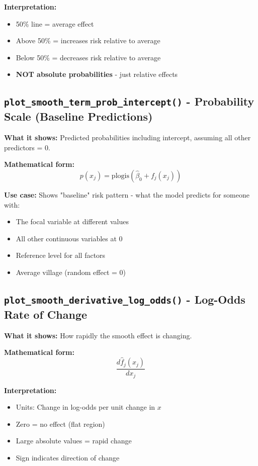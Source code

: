 \documentclass[12pt]{article}
\begin{document}
\textbf{Interpretation:}
\begin{itemize}
   \item 50\% line = average effect
   \item Above 50\% = increases risk relative to average
   \item Below 50\% = decreases risk relative to average
   \item \textbf{NOT absolute probabilities} - just relative effects
\end{itemize}

\subsection*{\texttt{plot\_smooth\_term\_prob\_intercept()} - Probability Scale (Baseline Predictions)}

\textbf{What it shows:} Predicted probabilities including intercept, assuming all other predictors = 0.

\textbf{Mathematical form:}
$$p(x_j) = \text{plogis}(\hat{\beta}_0 + f_j(x_j))$$

\textbf{Use case:} Shows "baseline" risk pattern - what the model predicts for someone with:
\begin{itemize}
   \item The focal variable at different values
   \item All other continuous variables at 0
   \item Reference level for all factors
   \item Average village (random effect = 0)
\end{itemize}

\subsection*{\texttt{plot\_smooth\_derivative\_log\_odds()} - Log-Odds Rate of Change}

\textbf{What it shows:} How rapidly the smooth effect is changing.

\textbf{Mathematical form:}
$$\frac{d\hat{f}_j(x_j)}{dx_j}$$

\textbf{Interpretation:}
\begin{itemize}
   \item Units: Change in log-odds per unit change in $x$
   \item Zero = no effect (flat region)
   \item Large absolute values = rapid change
   \item Sign indicates direction of change
\end{itemize}
\end{document}

